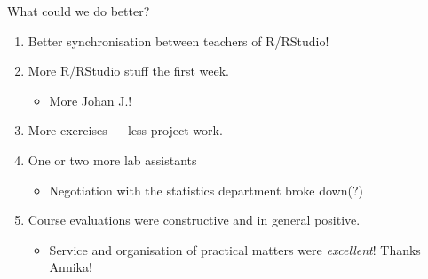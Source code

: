 \begin{frame}{What could we do better?}

\begin{enumerate}
\def\labelenumi{\arabic{enumi}.}
\item
  Better synchronisation between teachers of R/RStudio!
\item
  More R/RStudio stuff the first week.

  \begin{itemize}
  \itemsep1pt\parskip0pt
  \item
    More Johan J.!
  \end{itemize}
\item
  More exercises --- less project work.
\item
  One or two more lab assistants

  \begin{itemize}
  \itemsep1pt\parskip0pt
  \item
    Negotiation with the statistics department broke down(?)
  \end{itemize}
\item
  Course evaluations were constructive and in general positive.

  \begin{itemize}
  \itemsep1pt\parskip0pt
  \item
    Service and organisation of practical matters were \emph{excellent}!
    Thanks Annika!
  \end{itemize}
\end{enumerate}

\end{frame}
